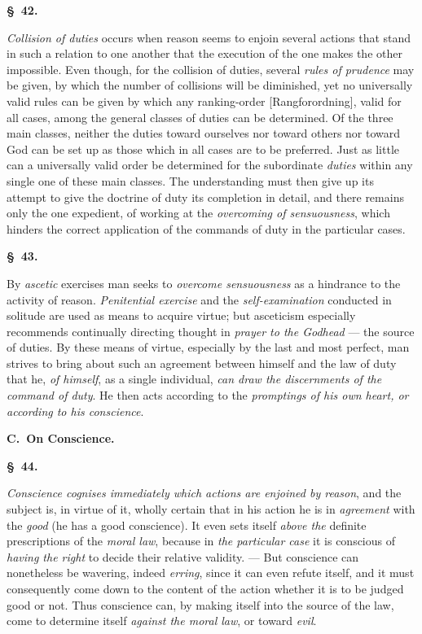 \documentclass[12pt]{article}
\newcommand{\opage}[1]{\marginnote{\footnotesize\textit{[#1]}}}
\newcommand{\slaw}[1]{\par\medskip\begin{center}\textbf{\S~#1.}\end{center}\nopagebreak}
\begin{document}
\slaw{42}
\emph{Collision of duties} occurs when reason seems to enjoin several actions that stand in such a relation to one another that the execution of the one makes the other impossible. Even though, for the collision of duties, several \emph{rules of prudence} may be given, by which the number of collisions will be diminished, yet no universally valid rules can be given by which any ranking-order [Rangforordning], valid for all cases, among the general classes of duties can be determined. Of the three main classes, neither the duties toward ourselves nor toward others nor toward God can be set up as those which in all cases are to be preferred. Just as little can a universally valid order be determined for the subordinate \emph{duties} within any single one of these main classes. The understanding must then give up its attempt to give the doctrine of duty its completion in detail, and there remains only the one expedient, of working at the \emph{overcoming of sensuousness}, which hinders the correct application of the commands of duty in the particular cases.

\slaw{43}
By \emph{ascetic} exercises man seeks to \emph{overcome sensuousness} as a hindrance to the activity of reason. \emph{Penitential exercise} and the \emph{self-examination} conducted in solitude are used as means to acquire virtue; but asceticism especially recommends continually directing thought in \emph{prayer to the Godhead} --- the source of duties. By these means of virtue, especially by the last and most perfect, man strives to bring about \opage{161}such an agreement between himself and the law of duty that he, \emph{of himself}, as a single individual, \emph{can draw the discernments of the command of duty}. He then acts according to the \emph{promptings of his own heart, or according to his conscience}.

\begin{center}\textbf{C.\ On Conscience.}\end{center}

\slaw{44}
\emph{Conscience cognises immediately which actions are enjoined by reason}, and the subject is, in virtue of it, wholly certain that in his action he is in \emph{agreement} with the \emph{good} (he has a good conscience). It even sets itself \emph{above the} definite prescriptions of the \emph{moral law}, because in \emph{the particular case} it is conscious of \emph{having the right} to decide their relative validity. --- But conscience can nonetheless be wavering, indeed \emph{erring}, since it can even refute itself, and it must consequently come down to the content of the action whether it is to be judged good or not. Thus conscience can, by making itself into the source of the law, come to determine itself \emph{against the moral law}, or toward \emph{evil}.
\end{document}
